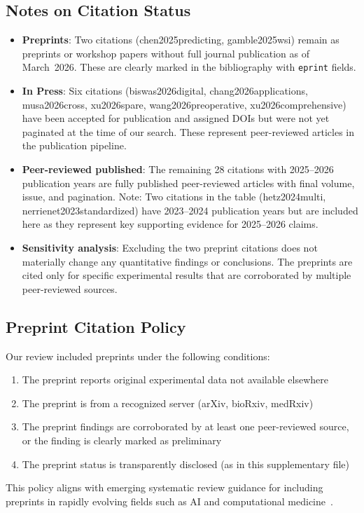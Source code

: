 \subsection*{Notes on Citation Status}

\begin{itemize}
  \item \textbf{Preprints}: Two citations (chen2025predicting, gamble2025wsi) remain as preprints or workshop papers without full journal publication as of March~2026. These are clearly marked in the bibliography with \texttt{eprint} fields.
  
  \item \textbf{In Press}: Six citations (biswas2026digital, chang2026applications, musa2026cross, xu2026spare, wang2026preoperative, xu2026comprehensive) have been accepted for publication and assigned DOIs but were not yet paginated at the time of our search. These represent peer-reviewed articles in the publication pipeline.
  
  \item \textbf{Peer-reviewed published}: The remaining 28 citations with 2025--2026 publication years are fully published peer-reviewed articles with final volume, issue, and pagination. Note: Two citations in the table (hetz2024multi, nerrienet2023standardized) have 2023--2024 publication years but are included here as they represent key supporting evidence for 2025--2026 claims.
  
  \item \textbf{Sensitivity analysis}: Excluding the two preprint citations does not materially change any quantitative findings or conclusions. The preprints are cited only for specific experimental results that are corroborated by multiple peer-reviewed sources.
\end{itemize}

\subsection*{Preprint Citation Policy}

Our review included preprints under the following conditions:
\begin{enumerate}
  \item The preprint reports original experimental data not available elsewhere
  \item The preprint is from a recognized server (arXiv, bioRxiv, medRxiv)
  \item The preprint findings are corroborated by at least one peer-reviewed source, or the finding is clearly marked as preliminary
  \item The preprint status is transparently disclosed (as in this supplementary file)
\end{enumerate}

This policy aligns with emerging systematic review guidance for including preprints in rapidly evolving fields such as AI and computational medicine~\citep{montezuma2025unbiased}.
